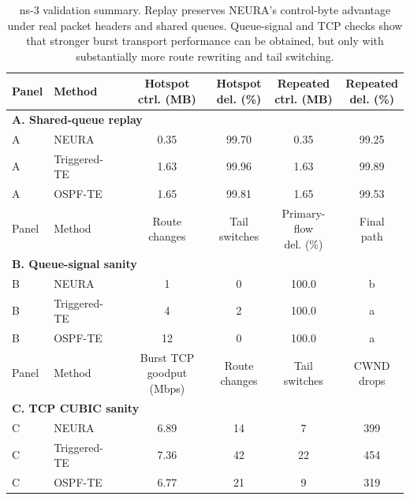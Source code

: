 \begin{table}[t]
\centering
\scriptsize
\caption{ns-3 validation summary. Replay preserves NEURA's control-byte advantage under real packet headers and shared queues. Queue-signal and TCP checks show that stronger burst transport performance can be obtained, but only with substantially more route rewriting and tail switching.}
\label{tab:ns3-summary}
\setlength{\tabcolsep}{4pt}
\renewcommand{\arraystretch}{1.05}
\begin{tabular}{@{}llcccc@{}}
\toprule
Panel & Method & \shortstack[c]{Hotspot\\ctrl. (MB)} & \shortstack[c]{Hotspot\\del. (\%)} & \shortstack[c]{Repeated\\ctrl. (MB)} & \shortstack[c]{Repeated\\del. (\%)} \\
\midrule
\multicolumn{6}{l}{\textbf{A. Shared-queue replay}} \\
\cmidrule(lr){1-6}
A & NEURA & 0.35 & 99.70 & 0.35 & 99.25 \\
A & Triggered-TE & 1.63 & 99.96 & 1.63 & 99.89 \\
A & OSPF-TE & 1.65 & 99.81 & 1.65 & 99.53 \\
\midrule
Panel & Method & \shortstack[c]{Route\\changes} & \shortstack[c]{Tail\\switches} & \shortstack[c]{Primary-flow\\del. (\%)} & \shortstack[c]{Final\\path} \\
\midrule
\multicolumn{6}{l}{\textbf{B. Queue-signal sanity}} \\
\cmidrule(lr){1-6}
B & NEURA & 1 & 0 & 100.0 & b \\
B & Triggered-TE & 4 & 2 & 100.0 & a \\
B & OSPF-TE & 12 & 0 & 100.0 & a \\
\midrule
Panel & Method & \shortstack[c]{Burst TCP\\goodput (Mbps)} & \shortstack[c]{Route\\changes} & \shortstack[c]{Tail\\switches} & \shortstack[c]{CWND\\drops} \\
\midrule
\multicolumn{6}{l}{\textbf{C. TCP CUBIC sanity}} \\
\cmidrule(lr){1-6}
C & NEURA & 6.89 & 14 & 7 & 399 \\
C & Triggered-TE & 7.36 & 42 & 22 & 454 \\
C & OSPF-TE & 6.77 & 21 & 9 & 319 \\
\bottomrule
\end{tabular}
\end{table}